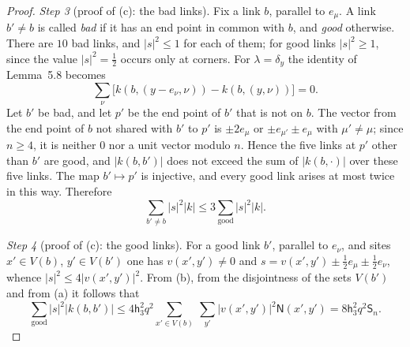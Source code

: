 \documentclass[11pt,letterpaper,reqno]{amsart}
\theoremstyle{definition}
\begin{document}
\begin{proof}
\emph{Step 3} (proof of (c): the bad links).
Fix a link $b$, parallel to $e_\mu$.
A link $b'\ne b$ is called \emph{bad} if it has an end point in common with $b$, and \emph{good} otherwise.
There are $10$ bad links, and $|s|^2\le1$ for each of them; for good links $|s|^2\ge1$, since the value $|s|^2=\frac12$ occurs only at corners.
For $\lambda=\delta_y$ the identity of Lemma~5.8 becomes
\begin{equation*}
\sum_\nu\bigl[k(b,(y-e_\nu,\nu))-k(b,(y,\nu))\bigr]=0.
\end{equation*}
Let $b'$ be bad, and let $p'$ be the end point of $b'$ that is not on $b$.
The vector from the end point of $b$ not shared with $b'$ to $p'$ is $\pm2e_\mu$ or $\pm e_{\mu'}\pm e_\mu$ with $\mu'\ne\mu$; since $n\ge4$, it is neither $0$ nor a unit vector modulo $n$.
Hence the five links at $p'$ other than $b'$ are good, and $|k(b,b')|$ does not exceed the sum of $|k(b,\cdot)|$ over these five links.
The map $b'\mapsto p'$ is injective, and every good link arises at most twice in this way.
Therefore
\begin{equation*}
\sum_{b'\ne b}|s|^2|k|\le3\sum_{\mathrm{good}}|s|^2|k|.
\end{equation*}

\emph{Step 4} (proof of (c): the good links).
For a good link $b'$, parallel to $e_\nu$, and sites $x'\in V(b)$, $y'\in V(b')$ one has $v(x',y')\ne0$ and $s=v(x',y')\pm\frac12e_\mu\pm\frac12e_\nu$, whence $|s|^2\le4|v(x',y')|^2$.
From (b), from the disjointness of the sets $V(b')$ and from (a) it follows that
\begin{equation*}
\sum_{\mathrm{good}}|s|^2|k(b,b')|\le4\mathsf h_3^2q^2\sum_{x'\in V(b)}\ \sum_{y'}|v(x',y')|^2\mathsf N(x',y')=8\mathsf h_3^2q^2\mathsf S_n.
\end{equation*}
\end{proof}
\end{document}
